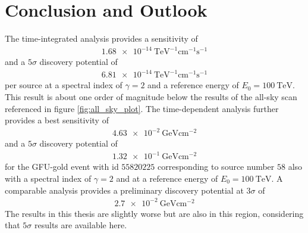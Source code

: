 \chapter{Conclusion and Outlook} \label{sec:outlook}

The time-integrated analysis provides a sensitivity of
\begin{align}
  \SI{1.68e-14}{\tera\electronvolt\tothe{-1}\centi\meter\tothe{-1}\second\tothe{-1}}
\end{align}
and a $\num{5}\sigma$ discovery potential of
\begin{align}
  \SI{6.81e-14}{\tera\electronvolt\tothe{-1}\centi\meter\tothe{-1}\second\tothe{-1}}
\end{align}
per source at a spectral index of $\gamma=\num{2}$ and a reference energy of $E_0=\SI{100}{\tera\electronvolt}$.
This result is about one order of magnitude below the results of the all-sky scan \cite{all_sky_paper} referenced in figure \ref{fig:all_sky_plot}.
The time-dependent analysis further provides a best sensitivity of
\begin{align}
  \SI{4.63e-2}{\giga\electronvolt\centi\meter\tothe{-2}}
\end{align}
and a $\num{5}\sigma$ discovery potential of
\begin{align}
  \SI{1.32e-1}{\giga\electronvolt\centi\meter\tothe{-2}}
\end{align}
for the GFU-gold event with id $\num{55820225}$ corresponding to source number $\num{58}$ also with a spectral index of $\gamma=2$ and at a reference energy of $E_0=\SI{100}{\tera\electronvolt}$.
A comparable analysis \cite{martina} provides a preliminary discovery potential at $\num{3}\sigma$ of
\begin{align}
  \SI{2.7e-2}{\giga\electronvolt\centi\meter\tothe{-2}}
\end{align}
The results in this thesis are slightly worse but are also in this region, considering that $\num{5}\sigma$ results are available here.

